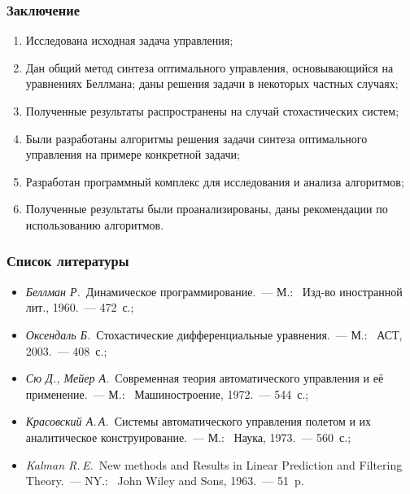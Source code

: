 \documentclass[ignorenonframetext,hyperref={pdftex,unicode,pdfpagelabels=false},compress]{beamer}
\begin{document}
\begin{frame}
    \frametitle{Заключение}

    \begin{enumerate}
        \item
            Исследована исходная задача управления;

        \item
            Дан общий метод синтеза оптимального управления, основывающийся на уравнениях Беллмана; даны решения задачи в некоторых частных случаях;

        \item
            Полученные результаты распространены на случай стохастических систем;

        \item
            Были разработаны алгоритмы решения задачи синтеза оптимального управления на примере конкретной задачи;

        \item
            Разработан программный комплекс для исследования и анализа алгоритмов;

        \item
            Полученные результаты были проанализированы, даны рекомендации по использованию алгоритмов.
    \end{enumerate}
\end{frame}


\begin{frame}
    \frametitle{Список литературы}

    \begin{itemize}
        \item
            \emph{Беллман Р.}~Динамическое программирование.~--- М.:~ Изд-во иностранной лит., 1960.~--- 472~с.;

        \item
            \emph{Оксендаль Б.}~Стохастические дифференциальные уравнения.~--- М.:~ АСТ, 2003.~--- 408~с.;

        \item
            \emph{Сю Д., Мейер А.}~Современная теория автоматического управления и её применение.~--- М.:~ Машиностроение, 1972.~--- 544~с.;

        \item
            \emph{Красовский А.\,А.}~Системы автоматического управления полетом и их аналитическое конструирование.~--- М.:~ Наука, 1973.~--- 560~с.;

        \item
            \emph{Kalman R.\,E.}~New methods and Results in Linear Prediction and Filtering Theory.~--- NY.:~ John Wiley and Sons, 1963.~--- 51~p.
    \end{itemize}
\end{frame}
\end{document}
